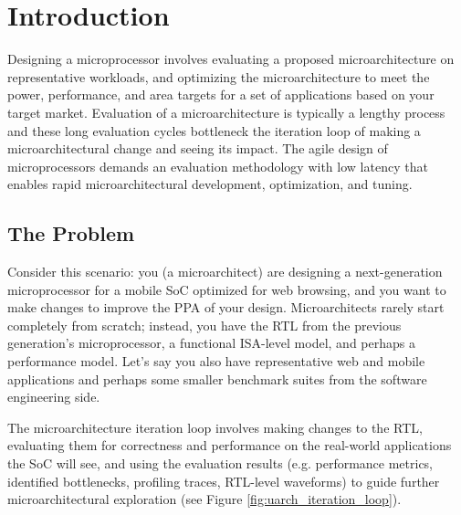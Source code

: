 \documentclass[sigplan,nonacm,10pt]{acmart}
\begin{document}

\maketitle

\section{Introduction}


Designing a microprocessor involves evaluating a proposed microarchitecture on representative workloads, and optimizing the microarchitecture to meet the power, performance, and area targets for a set of applications based on your target market.
Evaluation of a microarchitecture is typically a lengthy process and these long evaluation cycles bottleneck the iteration loop of making a microarchitectural change and seeing its impact.
The agile design of microprocessors demands an evaluation methodology with low latency that enables rapid microarchitectural development, optimization, and tuning.

\subsection{The Problem}

Consider this scenario: you (a microarchitect) are designing a next-generation microprocessor for a mobile SoC optimized for web browsing, and you want to make changes to improve the PPA of your design.
Microarchitects rarely start completely from scratch; instead, you have the RTL from the previous generation's microprocessor, a functional ISA-level model, and perhaps a performance model.
Let's say you also have representative web and mobile applications and perhaps some smaller benchmark suites from the software engineering side.

The microarchitecture iteration loop involves making changes to the RTL, evaluating them for correctness and performance on the real-world applications the SoC will see, and using the evaluation results (e.g. performance metrics, identified bottlenecks, profiling traces, RTL-level waveforms) to guide further microarchitectural exploration (see Figure \ref{fig:uarch_iteration_loop}).
\end{document}
